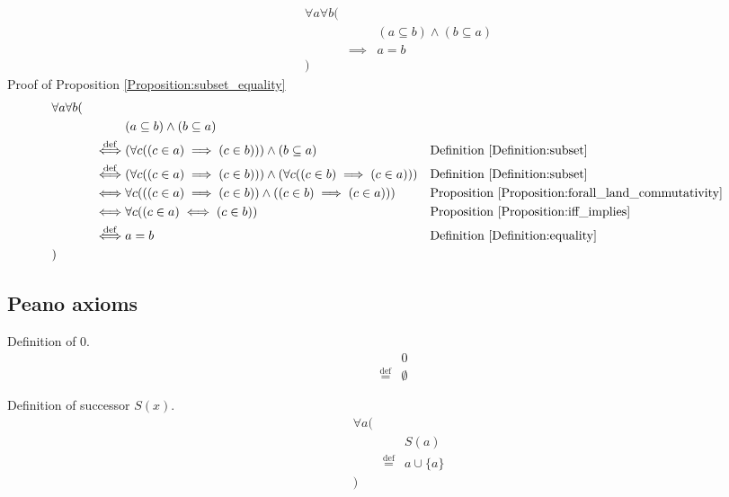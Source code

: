 \begin{prop}
\label{Proposition:subset_equality}
\begin{align*}
& \forall a \forall b ( \\
& & & (a \subseteq b) \land (b \subseteq a) \\
& & \implies & a = b \\
& )
\end{align*}
Proof of Proposition \ref{Proposition:subset_equality}
\begin{align*}
& \forall a \forall b ( \\
& & & (a \subseteq b) \land (b \subseteq a) \\
& & \overset{\operatorname{def}}{\iff} & (\forall c ((c \in a) \implies (c \in b))) \land (b \subseteq a)
& & \text{Definition \ref{Definition:subset}} \\
& & \overset{\operatorname{def}}{\iff} & (\forall c ((c \in a) \implies (c \in b))) \land (\forall c ((c \in b) \implies (c \in a)))
& & \text{Definition \ref{Definition:subset}} \\
& & \iff & \forall c (((c \in a) \implies (c \in b)) \land ((c \in b) \implies (c \in a)))
& & \text{Proposition \ref{Proposition:forall_land_commutativity}} \\
& & \iff & \forall c ((c \in a) \iff (c \in b))
& & \text{Proposition \ref{Proposition:iff_implies}} \\
& & \overset{\operatorname{def}}{\iff} & a = b
& & \text{Definition \ref{Definition:equality}} \\
& )
\end{align*}
\end{prop}

\subsection{Peano axioms}
\begin{defn}
\label{Definition:zero}
Definition of 0.
\begin{align*}
& 0 \\
\overset{\operatorname{def}}{=} & \emptyset
\end{align*}
\end{defn}

\begin{defn}
\label{Definition:successor}
Definition of successor $S(x)$.
\begin{align*}
& \forall a ( \\
& & & S(a) \\
& & \overset{\operatorname{def}}{=} & a \cup \{ a \} \\
& )
\end{align*}
\end{defn}

